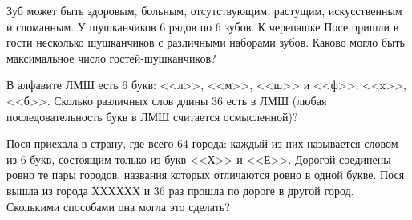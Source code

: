 \begin{problems}
\item Зуб может быть здоровым, больным, отсутствующим, растущим, искусственным и сломанным. У шушканчиков 6 рядов по 6 зубов. К черепашке Посе пришли в гости несколько шушканчиков с различными наборами зубов. Каково могло быть максимальное число гостей-шушканчиков? %

\item В алфавите ЛМШ есть 6 букв: <<л>>, <<м>>, <<ш>> и <<ф>>, <<x>>, <<б>>. Сколько различных слов длины 36 есть в ЛМШ (любая последовательность букв в ЛМШ считается осмысленной)? %

\item Пося приехала в страну, где всего 64 города: каждый из них называется словом из 6 букв, состоящим только из букв <<Х>> и <<Е>>. Дорогой соединены ровно те пары городов, названия которых отличаются ровно в одной букве. Пося вышла из города ХХХХХХ и 36 раз прошла по дороге в другой город. Сколькими способами она могла это сделать? %


\end{problems}